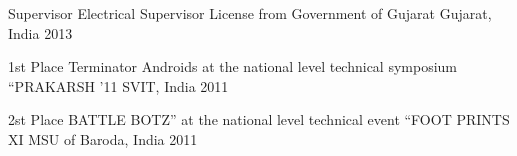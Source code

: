 





\begin{cvhonors}
	
	\cvhonor
	{Supervisor} %
	{Electrical Supervisor License from Government of Gujarat} %
	{Gujarat, India} %
	{2013} %
\end{cvhonors}
\begin{cvhonors}
	
	\cvhonor
	{1st Place} %
	{Terminator Androids at the national level technical symposium “PRAKARSH ’11} %
	{SVIT, India} %
	{2011} %
\end{cvhonors}



\begin{cvhonors}
	\cvhonor
	{2st Place} %
	{BATTLE BOTZ” at the national level technical event “FOOT PRINTS XI} %
	{MSU of Baroda, India} %
	{2011} %
\end{cvhonors}

